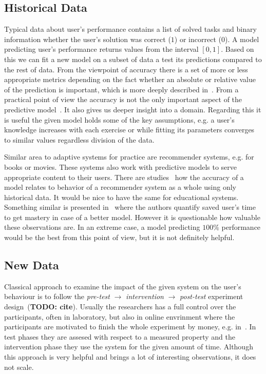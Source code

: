 \documentclass[table,color]{fithesis3/fithesis3}
\begin{document}
\subsection{Historical Data}

Typical data about user's performance contains a list of solved tasks and
binary information whether the user's solution was correct ($1$) or incorrect
($0$). A model predicting user's performance returns values from the interval
$[0, 1]$. Based on this we can fit a new model on a subset of data a test its
predictions compared to the rest of data. From the viewpoint of accuracy there
is a set of more or less appropriate metrics depending on the fact whether an
absolute or relative value of the prediction is important, which is more deeply
described in~\cite{pelanek2014brief}.  From a practical point of view the
accuracy is not the only important aspect of the predictive
model~\cite{huang2015framework}. It also gives us deeper insight into a domain.
Regarding this it is useful the given model holds some of the key assumptions,
e.g. a user's knowledge increases with each exercise or while fitting its
parameters converges to similar values regardless division of the data.

Similar area to adaptive systems for practice are recommender systems, e.g. for
books or movies. These systems also work with predictive models to serve
appropriate content to their users. There are
studies~\cite{cremonesi2010performance} how the accuracy of a model relates to
behavior of a recommender system as a whole using only historical data. It
would be nice to have the same for educational systems. Something similar is
presented in~\cite{yudelson2015small} where the authors quantify saved user's
time to get mastery in case of a better model. However it is questionable how
valuable these observations are. In an extreme case, a model predicting $100\%$
performance would be the best from this point of view, but it is not definitely
helpful.

\subsection{New Data}

Classical approach to examine the impact of the given system on the user's
behaviour is to follow the \emph{pre-test} $\rightarrow$ \emph{intervention}
$\rightarrow$ \emph{post-test} experiment design~(\textbf{TODO: cite}). Usually
the researchers has a full control over the participants, often in laboratory,
but also in online envrinment where the participants are motivated to finish
the whole experiment by money, e.g. in~\cite{maass2015how}. In test phases they
are assesed with respect to a measured property and the intervention phase they
use the system for the given amount of time. Although this approach is very
helpful and brings a lot of interesting observations, it does not scale.
\end{document}
